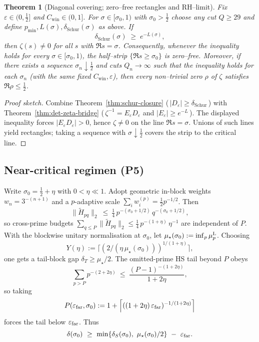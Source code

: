 \documentclass[11pt]{article}
\newtheorem{theorem}{Theorem}
\theoremstyle{definition}
\theoremstyle{remark}
\begin{document}
\begin{theorem}[Diagonal covering; zero--free rectangles and RH--limit]\label{thm:covering}
Fix $\varepsilon\in(0,\tfrac12]$ and $C_{\mathrm{win}}\in(0,1]$. For $\sigma\in[\sigma_{0},1)$ with $\sigma_{0}>\tfrac12$ choose any cut $Q\ge29$ and define $p_{\min},L(\sigma),\delta_{\mathrm{Schur}}(\sigma)$ as above. If
\[
  \delta_{\mathrm{Schur}}(\sigma)\;\ge\; e^{-L(\sigma)},
\]
then $\zeta(s)\neq 0$ for all $s$ with $\Re s=\sigma$. Consequently, whenever the inequality holds for every $\sigma\in[\sigma_{0},1)$, the half--strip $\{\Re s\ge\sigma_{0}\}$ is zero--free. Moreover, if there exists a sequence $\sigma_{n}\downarrow\tfrac12$ and cuts $Q_{n}\to\infty$ such that the inequality holds for each $\sigma_{n}$ (with the same fixed $C_{\mathrm{win}},\varepsilon$), then every non--trivial zero $\rho$ of $\zeta$ satisfies $\Re\rho\le\tfrac12$.
\end{theorem}

\begin{proof}[Proof sketch]
Combine Theorem~\ref{thm:schur-closure} (\,$|D_{\varepsilon}|\ge\delta_{\mathrm{Schur}}$\,) with Theorem~\ref{thm:det-zeta-bridge} (\,$\zeta^{-1}=E_{\varepsilon}D_{\varepsilon}$ and $|E_{\varepsilon}|\ge e^{-L}$\,). The displayed inequality forces $|E_{\varepsilon}D_{\varepsilon}|>0$, hence $\zeta\ne0$ on the line $\Re s=\sigma$. Unions of such lines yield rectangles; taking a sequence with $\sigma\downarrow\tfrac12$ covers the strip to the critical line.
\end{proof}


\subsection*{Near-critical regimen (P5)}
Write $\sigma_0=\tfrac12+\eta$ with $0<\eta\ll1$. Adopt geometric in-block weights $w_n=3^{-(n+1)}$ and a $p$-adaptive scale $\sum_i w_i^{(p)}=\tfrac12 p^{-1/2}$. Then
\[ \|\widetilde H_{pq}\|_2\ \le\ \tfrac14\,p^{-(\sigma_0+1/2)}\,q^{-(\sigma_0+1/2)}, \]
so cross-prime budgets $\sum_{q\le P}\|\widetilde H_{pq}\|_2\le \tfrac14\,p^{-(1+\eta)}\,\eta^{-1}$ are independent of $P$. With the blockwise unitary normalisation at $\sigma_0$, let $\mu_\star(\sigma_0):=\inf_p\mu_p^{\rm L}$. Choosing
\[ Y(\eta):=\Big\lceil(2/(\eta\,\mu_\star(\sigma_0)))^{1/(1+\eta)}\Big\rceil, \]
one gets a tail-block gap $\delta_T\ge \mu_\star/2$. The omitted-prime HS tail beyond $P$ obeys
\[ \sum_{p>P} p^{-(2+2\eta)}\ \le\ \frac{(P-1)^{-(1+2\eta)}}{1+2\eta}, \]
so taking
\[ P(\varepsilon_{\rm far},\sigma_0):=1+\Big\lceil ((1+2\eta)\,\varepsilon_{\rm far})^{-1/(1+2\eta)}\Big\rceil \]
forces the tail below $\varepsilon_{\rm far}$. Thus
\[ \delta(\sigma_0)\ \ge\ \min\{\delta_S(\sigma_0),\ \mu_\star(\sigma_0)/2\}\ -\ \varepsilon_{\rm far}. \]
\end{document}
